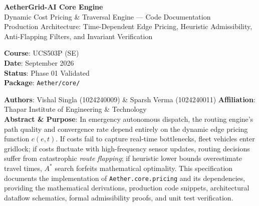 \documentclass[10pt,a4paper]{article}
\begin{document}
\begin{tcolorbox}[
  enhanced,
  colback=brandnavy,
  colframe=brandnavy,
  arc=4pt,
  boxrule=0pt,
  top=10pt, bottom=10pt, left=14pt, right=14pt,
  drop shadow={opacity=0.15}
]
  \begin{minipage}{0.73\textwidth}
    {\fontsize{19}{23}\sffamily\bfseries\color{white}AetherGrid-AI Core Engine}\\[3pt]
    {\large\sffamily\color{brandsurface}Dynamic Cost Pricing \& Traversal Engine --- Code Documentation}\\[4pt]
    {\footnotesize\sffamily\color{brandborder}Production Architecture: Time-Dependent Edge Pricing, Heuristic Admissibility, Anti-Flapping Filters, and Invariant Verification}
  \end{minipage}
  \hfill
  \begin{minipage}{0.25\textwidth}
    \raggedleft
    {\sffamily\scriptsize\color{brandaccent}\textbf{Course}: UCS503P (SE)}\\[1.5pt]
    {\sffamily\scriptsize\color{brandborder}\textbf{Date}: September 2026}\\[1.5pt]
    {\sffamily\scriptsize\color{brandborder}\textbf{Status}: Phase 01 Validated}\\[1.5pt]
    {\sffamily\scriptsize\color{brandborder}\textbf{Package}: \texttt{Aether/core/}}
  \end{minipage}
\end{tcolorbox}

\vspace{1pt}

\begin{tcolorbox}[
  enhanced,
  colback=brandsurface,
  colframe=brandborder,
  boxrule=0.6pt,
  arc=3pt,
  top=5pt, bottom=5pt, left=10pt, right=10pt
]
  \sffamily\small
  \textbf{Authors}: Vishal Singla (1024240009) \& Sparsh Verma (1024240011) \hfill \textbf{Affiliation}: Thapar Institute of Engineering \& Technology \\[2pt]
  \textbf{Abstract \& Purpose}: In emergency autonomous dispatch, the routing engine's path quality and convergence rate depend entirely on the dynamic edge pricing function $c(e, t)$. If costs fail to capture real-time bottlenecks, fleet vehicles enter gridlock; if costs fluctuate with high-frequency sensor updates, routing decisions suffer from catastrophic \textit{route flapping}; if heuristic lower bounds overestimate travel times, $A^*$ search forfeits mathematical optimality. This specification documents the implementation of \texttt{Aether.core.pricing} and its dependencies, providing the mathematical derivations, production code snippets, architectural dataflow schematics, formal admissibility proofs, and unit test verification.
\end{tcolorbox}
\end{document}
